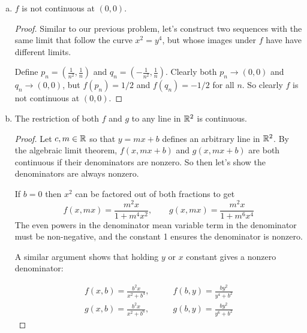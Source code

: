 \documentclass{article}
\begin{document}
\begin{enumerate}
\begin{enumerate}[a.]
\begin{proof}
To show this rigorously, let's construct an unbounded sequence on the graph of
$f$ that follows this unbounded ridge.

Define $p_n = (\frac{1}{n^3}, \frac{1}{n})$ so that $f(p_n) = \frac{n}{2}$.
Let $\epsilon > 0$ be arbitrarily small and let $M > 0$ be arbitrarily large.
If $n \geq 2M$ then $f(p_n) \geq M$. And by the algebraic limit theorem, there's
some $N$ where if $n \geq N$ then $\frac{1}{n^6} + \frac{1}{n^2} < \epsilon^2$.
This shows that $\lvert (\frac{1}{n^3}, \frac{1}{n}) \rvert < \epsilon$. Taking
$n \geq \max \{ 2M, N \}$ shows that $g$ is unbounded on every neighborhood of
$(0, 0)$.
\end{proof}

\item \claim $f$ is not continuous at $(0, 0)$.
\begin{proof}
Similar to our previous problem, let's construct two sequences with the same
limit that follow the curve $x^2 = y^4$, but whose images under $f$ have have
different limits.

Define $p_n = (\frac{1}{n^2}, \frac{1}{n})$ and
$q_n = (-\frac{1}{n^2}, \frac{1}{n})$. Clearly both $p_n \to (0, 0)$ and
$q_n \to (0, 0)$, but $f(p_n) = 1/2$ and $f(q_n) = -1/2$ for all $n$. So clearly
$f$ is not continuous at $(0, 0)$.
\end{proof}

\item \claim The restriction of both $f$ and $g$ to any line in $\mathbb{R}^2$ is
      continuous.

\begin{proof}
Let $c, m \in \mathbb{R}$ so that $y = mx + b$ defines an arbitrary line in $\mathbb{R}^2$.
By the algebraic limit theorem, $f(x, mx + b)$ and $g(x, mx+b)$ are both
continuous if their denominators are nonzero. So then let's show the
denominators are always nonzero.

If $b = 0$ then $x^2$ can be factored out of both fractions to get
\begin{equation*}
f(x, mx) = \frac{m^2x}{1+m^4x^2}, \qquad g(x, mx) = \frac{m^2x}{1+m^6x^4}
\end{equation*}
The even powers in the denominator mean variable term in the denominator must be
non-negative, and the constant 1 ensures the denominator is nonzero.

A similar argument shows that holding $y$ or $x$ constant gives a nonzero
denominator:

\begin{equation*}
\begin{split}
f(x, b) = \frac{b^2x}{x^2 + b^4}, &\qquad f(b, y) = \frac{by^2}{y^4 + b^2} \\
g(x, b) = \frac{b^2x}{x^2 + b^6}, &\qquad g(b, y) = \frac{by^2}{y^6 + b^2}
\end{split}
\end{equation*}


\end{proof}
\end{enumerate}
\end{enumerate}
\end{document}
